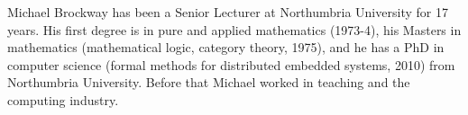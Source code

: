 \documentclass[10pt,journal]{IEEEtran}
\begin{document}
\begin{IEEEbiography}{Michael Brockway}
has been a Senior Lecturer at Northumbria University for 17 years. His first degree is in pure and applied mathematics (1973-4), his Masters in mathematics (mathematical logic, category theory, 1975), and he has a PhD in computer science (formal methods for distributed embedded systems, 2010) from Northumbria University. Before that Michael worked in teaching and the computing industry.
\end{IEEEbiography}
\end{document}
